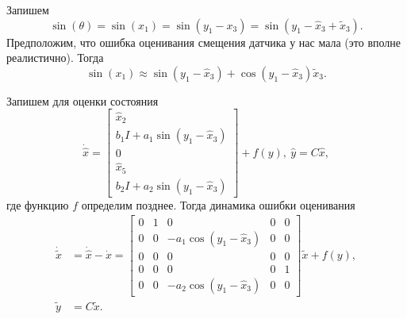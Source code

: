 \documentclass{article}
\begin{document}
Запишем
\[
	\sin(\theta) = \sin(x_1) = \sin(y_1-x_3) = \sin(y_1-\hat{x}_3+\tilde{x}_3).
\]
Предположим, что ошибка оценивания смещения датчика у нас мала (это вполне реалистично). Тогда
\[
	\sin(x_1) \approx \sin(y_1-\hat{x}_3) + \cos(y_1-\hat{x}_3)\tilde{x}_3.
\]

Запишем для оценки состояния
\[
	\dot{\hat{x}} = \begin{bmatrix} \hat{x}_2 \\ b_1I +a_1\sin(y_1-\hat{x}_3) \\ 0 \\ \hat{x}_5 \\ b_2I +a_2\sin(y_1-\hat{x}_3) \end{bmatrix} + f(y),
	\ \hat{y} = C\hat{x},
\]
где функцию $f$ определим позднее. Тогда динамика ошибки оценивания
\[
	\begin{aligned}
		\dot{\tilde{x}} &= \dot{\hat{x}} - \dot{x} = \begin{bmatrix} 0 & 1 & 0 					 & 0 & 0 \\
										  0 & 0 &-a_1\cos(y_1-\hat{x}_3) & 0 & 0 \\
										  0 & 0 & 0 					 & 0 & 0 \\
										  0 & 0 & 0						 & 0 & 1 \\
										  0 & 0 &-a_2\cos(y_1-\hat{x}_3) & 0 & 0
						 \end{bmatrix}\tilde{x} + f(y), \\
		\tilde{y} &= C\tilde{x}.
	\end{aligned}
\]
\end{document}
